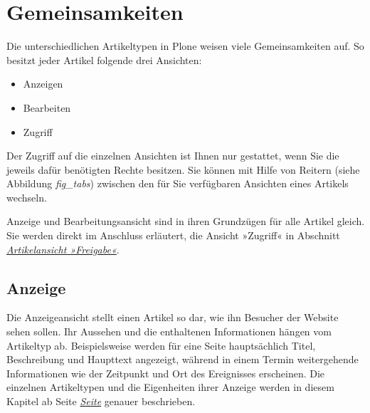 \documentclass[a4paper,12pt,ngerman]{manual}
\begin{document}
\resetcurrentobjects
\hypertarget{--doc-inhaltstypen/gemeinsamkeiten}{}

\hypertarget{sec-inhaltstypen-gemeinsamkeiten}{}\section{Gemeinsamkeiten}

Die unterschiedlichen Artikeltypen in Plone weisen viele Gemeinsamkeiten auf.
So besitzt jeder Artikel folgende drei Ansichten:
\begin{itemize}
\item {} 
Anzeigen

\item {} 
Bearbeiten

\item {} 
Zugriff

\end{itemize}

Der Zugriff auf die einzelnen Ansichten ist Ihnen nur gestattet, wenn Sie die
jeweils dafür benötigten Rechte besitzen. Sie können mit Hilfe von Reitern
(siehe Abbildung \emph{fig\_tabs})
\hypertarget{fig-tabs}{}
zwischen den für Sie verfügbaren Ansichten eines Artikels wechseln.

Anzeige und Bearbeitungsansicht sind in ihren Grundzügen für alle Artikel
gleich. Sie werden direkt im Anschluss erläutert, die Ansicht »Zugriff« in
Abschnitt \hyperlink{sec-zugriffsrechte-ansicht}{\emph{Artikelansicht »Freigabe«}}.


\hypertarget{sec-gemeinsamkeiten-anzeige}{}\subsection{Anzeige}

Die Anzeigeansicht stellt einen Artikel so dar, wie ihn Besucher der Website sehen
sollen. Ihr Aussehen und die enthaltenen Informationen hängen vom Artikeltyp
ab. Beispielsweise werden für eine Seite hauptsächlich Titel, Beschreibung und
Haupttext angezeigt, während in einem Termin weitergehende Informationen wie
der Zeitpunkt und Ort des Ereignisses erscheinen. Die einzelnen
Artikeltypen und die Eigenheiten ihrer Anzeige werden in diesem Kapitel ab
Seite \hyperlink{sec-dokument}{\emph{Seite}} genauer beschrieben.
\end{document}

